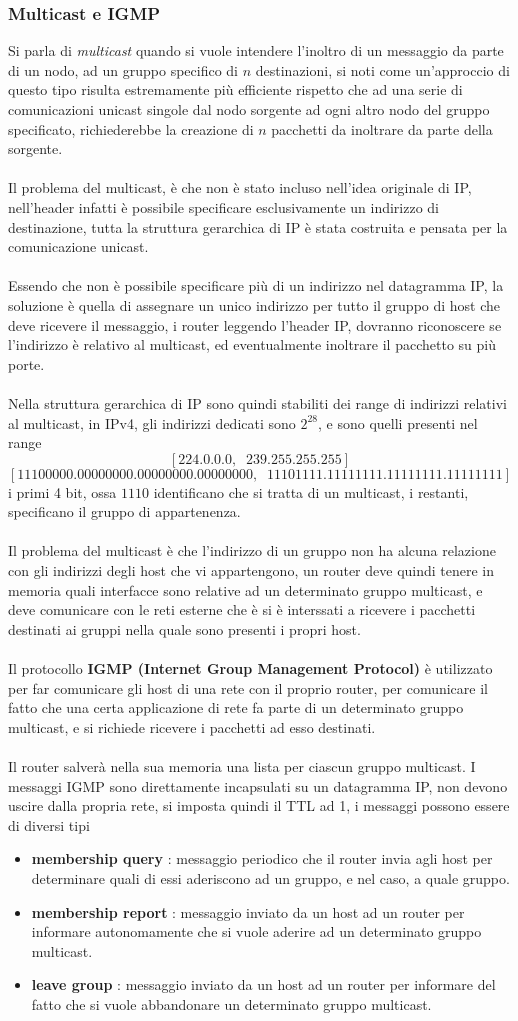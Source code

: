 \documentclass[12pt, letterpaper]{article}
\newcommand{\acc}{\\\hphantom{}\\}
\begin{document}
\subsubsection{Multicast e IGMP}
Si parla di \textit{multicast} quando si vuole intendere l'inoltro di un messaggio da parte di un nodo, ad un gruppo
specifico di $n$ destinazioni, si noti come un'approccio di questo tipo risulta estremamente più efficiente rispetto che 
ad una serie di comunicazioni unicast singole dal nodo sorgente ad ogni altro nodo del gruppo specificato, richiederebbe 
la creazione di $n$ pacchetti da inoltrare da parte della sorgente.\acc 
Il problema del multicast, è che non è stato incluso nell'idea originale di IP, nell'header infatti è possibile 
specificare esclusivamente un indirizzo di destinazione, tutta la struttura gerarchica di IP è stata costruita e pensata 
per la comunicazione unicast. \acc 
Essendo che non è possibile specificare più di un indirizzo nel datagramma IP, la soluzione è quella di assegnare un 
unico indirizzo per tutto il gruppo di host che deve ricevere il messaggio, i router leggendo l'header IP, dovranno 
riconoscere se l'indirizzo è relativo al multicast, ed eventualmente inoltrare il pacchetto su più porte.\acc 
Nella struttura gerarchica di IP sono quindi stabiliti dei range di indirizzi relativi al multicast, in IPv4, 
gli indirizzi dedicati sono $2^{28}$, e sono quelli presenti nel range $$[224.0.0.0,\;\; 239.255.255.255]$$ 
$$ [11100000.00000000.00000000.00000000,\;\;11101111.11111111.11111111.11111111]$$
i primi 4 bit, ossa $1110$ identificano che si tratta di un multicast, i restanti, specificano il gruppo di appartenenza.
\acc 
Il problema del multicast è che l'indirizzo di un gruppo non ha alcuna relazione con gli indirizzi degli host che vi 
appartengono, un router deve quindi tenere in memoria quali interfacce sono relative ad un determinato gruppo multicast, 
e deve comunicare con le reti esterne che è si è interssati a ricevere i pacchetti destinati ai gruppi nella quale sono presenti 
i propri host.\acc 
Il protocollo \textbf{IGMP (Internet Group Management Protocol)} è utilizzato per far comunicare gli host di una 
rete con il proprio router, per comunicare il fatto che una certa applicazione di rete fa parte di un determinato 
gruppo multicast, e si richiede ricevere i pacchetti ad esso destinati.\acc Il router salverà nella sua memoria una lista per ciascun gruppo multicast.
I messaggi IGMP sono direttamente incapsulati su un datagramma IP, non devono uscire dalla propria rete, si imposta quindi il 
TTL ad 1, i messaggi possono essere di diversi tipi\begin{itemize}
    \item \textbf{membership query} : messaggio periodico che il router invia agli host per determinare quali di 
    essi aderiscono ad un gruppo, e nel caso, a quale gruppo. 
    \item \textbf{membership report} : messaggio inviato da un host ad un router per informare autonomamente che si 
    vuole aderire ad un determinato gruppo multicast. 
    \item \textbf{leave group} : messaggio inviato da un host ad un router per informare del fatto che si vuole 
    abbandonare un determinato gruppo multicast. 
\end{itemize}
\end{document}
